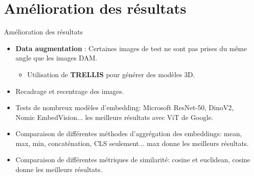 \documentclass{beamer}
\begin{document}
\section{Amélioration des résultats}
\begin{frame}{Amélioration des résultats}
\begin{itemize}
    \item \textbf{Data augmentation} : Certaines images de test ne sont pas prises du même angle que les images DAM.
    \begin{itemize}
        \item Utilisation de \textbf{TRELLIS} pour générer des modèles 3D.
    \end{itemize}
    \item Recadrage et recentrage des images.
    \item Tests de nombreux modèles d'embedding: Microsoft ResNet-50, DinoV2, Nomic EmbedVision... les meilleurs résultats avec ViT de Google.
    \item Comparaison de différentes méthodes d'aggrégation des embeddings: mean, max, min, concaténation, CLS seulement... max donne les meilleurs résultats.
    \item Comparaison de différentes métriques de similarité: cosine et euclidean, cosine donne les meilleurs résultats.
\end{itemize}
\end{frame}
\end{document}

